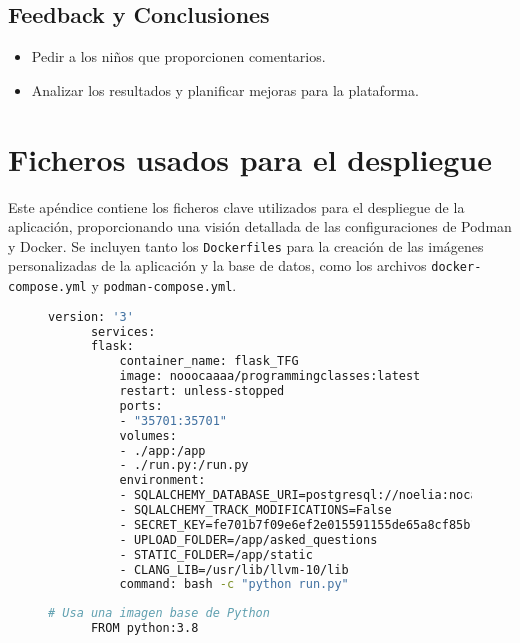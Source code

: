 \begin{appendices}
\section{Feedback y Conclusiones}
\begin{itemize}
    \item Pedir a los niños que proporcionen comentarios.
    \item Analizar los resultados y planificar mejoras para la plataforma.
\end{itemize}

\chapter{Ficheros usados para el despliegue} \label{podmananddockerfile}

Este apéndice contiene los ficheros clave utilizados para el despliegue de la aplicación, proporcionando una visión detallada de las configuraciones de Podman y Docker. Se incluyen tanto los \texttt{Dockerfiles} para la creación de las imágenes personalizadas de la aplicación y la base de datos, como los archivos \texttt{docker-compose.yml} y \texttt{podman-compose.yml}.

\begin{figure}[H]
    \centering
    \begin{lstlisting}[language=bash, caption={Docker-compose de prueba}, label=fig:dockercompose]
      version: '3'
      services:
      flask:
          container_name: flask_TFG
          image: nooocaaaa/programmingclasses:latest
          restart: unless-stopped
          ports:
          - "35701:35701"
          volumes:
          - ./app:/app
          - ./run.py:/run.py
          environment:
          - SQLALCHEMY_DATABASE_URI=postgresql://noelia:nocavi12@192.168.1.129:5432/mydatabase
          - SQLALCHEMY_TRACK_MODIFICATIONS=False
          - SECRET_KEY=fe701b7f09e6ef2e015591155de65a8cf85b160e6a75490a
          - UPLOAD_FOLDER=/app/asked_questions
          - STATIC_FOLDER=/app/static
          - CLANG_LIB=/usr/lib/llvm-10/lib
          command: bash -c "python run.py"
    \end{lstlisting}
\end{figure}
 
\begin{figure}[H]
    \centering
    \begin{lstlisting}[language=bash, caption={Dockerfile para la creación de la imagen de la app}, label=fig:dockerfileapp]
      # Usa una imagen base de Python
      FROM python:3.8
      

\end{lstlisting}
\end{figure}
\end{appendices}
